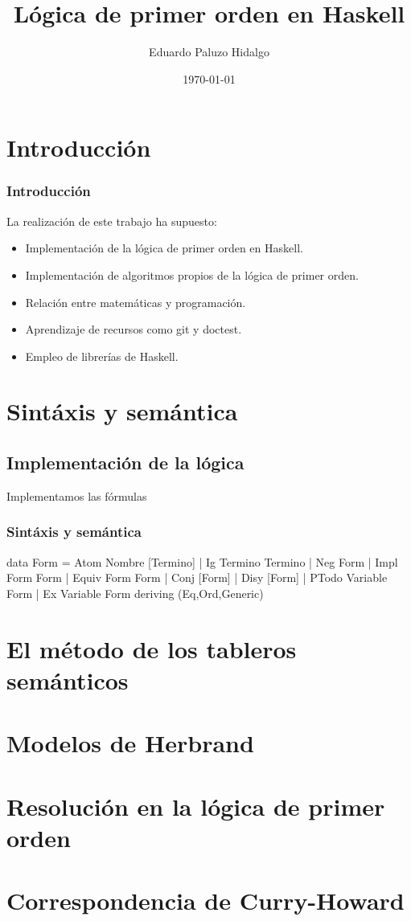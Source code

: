 \documentclass{beamer}
\title[LPO en Haskell]{Lógica de primer orden en Haskell}
\author[Eduardo P.]{Eduardo Paluzo Hidalgo}
\institute[US]{Universidad de Sevilla}
\date{\today}
\begin{document}
 
\frame{\titlepage}

\frame{\tableofcontents}
\section{Introducción}
\begin{frame}
  \frametitle{Introducción}
  La realización de este trabajo ha supuesto:
  \begin{itemize}
  \item Implementación de la lógica de primer orden en Haskell.
  \item Implementación de algoritmos propios de la lógica de primer orden.
  \item Relación entre matemáticas y programación.
  \item Aprendizaje de recursos como git y doctest.
  \item Empleo de librerías de Haskell.
  \end{itemize}
\end{frame}

\section{Sintáxis y semántica}

\subsection{Implementación de la lógica}
\begin{frame}[fragile]

  Implementamos las fórmulas
  
  \frametitle{Sintáxis y semántica}
  \begin{code}
    data Form = Atom Nombre [Termino]
          | Ig Termino Termino
          | Neg Form
          | Impl Form Form
          | Equiv Form Form
          | Conj [Form]
          | Disy [Form]
          | PTodo Variable Form
          | Ex Variable Form
  deriving (Eq,Ord,Generic)
  \end{code}
\end{frame}

\section{El método de los tableros semánticos}
\section{Modelos de Herbrand}
\section{Resolución en la lógica de primer orden}
\section{Correspondencia de Curry-Howard}
\end{document}
